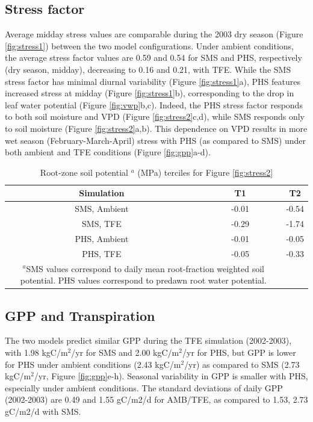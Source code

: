 \documentclass[draft,linenumbers]{agujournal}
\begin{document}
\subsection{Stress factor}
    
    Average midday stress values are comparable during the 2003 dry season (Figure \ref{fig:stress1}) between the two model configurations.
    Under ambient conditions, the average stress factor values are 0.59 and 0.54 for SMS and PHS, respectively (dry season, midday), 
    decreasing to 0.16 and 0.21, with TFE.
    While the SMS stress factor has minimal diurnal variability (Figure \ref{fig:stress1}a),
    PHS features increased stress at midday (Figure \ref{fig:stress1}b), corresponding to the drop in leaf water potential (Figure \ref{fig:vwp}b,c).
    Indeed, the PHS stress factor responds to both soil moisture and VPD (Figure \ref{fig:stress2}c,d), while SMS responds only to soil moisture (Figure \ref{fig:stress2}a,b).
    This dependence on VPD results in more wet season (February-March-April) stress with PHS (as compared to SMS) under both ambient and TFE conditions (Figure \ref{fig:gpp}a-d).

\begin{table}
\caption{Root-zone soil potential $^a$ (MPa) terciles for Figure \ref{fig:stress2}}
\label{tab:tercile}
\centering
\begin{tabular}{c c c }
Simulation & T1 & T2 \\
\hline
SMS, Ambient & -0.01 & -0.54 \\
SMS, TFE & -0.29 & -1.74 \\
PHS, Ambient & -0.01 & -0.05 \\
PHS, TFE & -0.05 & -0.33 \\
\hline
\multicolumn{2}{p{.5\linewidth}}{$^{a}$SMS values correspond to daily mean root-fraction weighted soil potential.
PHS values correspond to predawn root water potential.}
\end{tabular}
\end{table}


\subsection{GPP and Transpiration}
    The two models predict similar GPP during the TFE simulation (2002-2003), with 1.98 kgC/m$^2$/yr for SMS and 2.00 kgC/m$^2$/yr for PHS, 
    but GPP is lower for PHS under ambient conditions (2.43 kgC/m$^2$/yr) as compared to SMS (2.73 kgC/m$^2$/yr, Figure \ref{fig:gpp}e-h).
    Seasonal variability in GPP is smaller with PHS, especially under ambient conditions. 
    The standard deviations of daily GPP (2002-2003) are 0.49 and 1.55 gC/m2/d for AMB/TFE, 
    as compared to 1.53, 2.73 gC/m2/d with SMS. 
    
\end{document}
